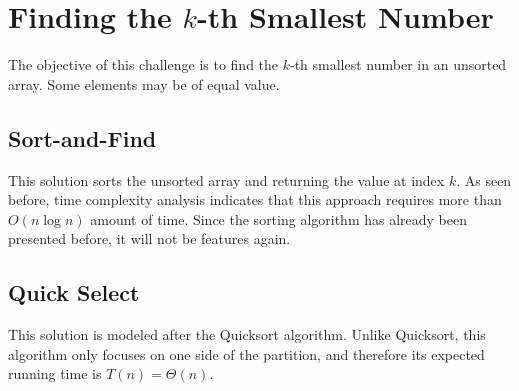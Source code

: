 \chapter{Finding the $k$-th Smallest Number}
The objective of this challenge is to find the $k$-th smallest number in an
unsorted array. Some elements may be of equal value.

\section{Sort-and-Find}
This solution sorts the unsorted array and returning the value at index $k$. As
seen before, time complexity analysis indicates that this approach requires more
than $O(n\log n)$ amount of time. Since the sorting algorithm has already been
presented before, it will not be features again.

\section{Quick Select}
This solution is modeled after the Quicksort algorithm. Unlike Quicksort, this
algorithm only focuses on one side of the partition, and therefore its expected
running time is $T(n)=\Theta(n)$.
